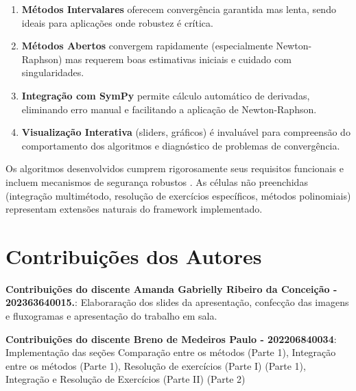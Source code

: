 \documentclass[
	12pt,				%
	openright,			%
	oneside,			%
	a4paper,			%
	english,			%
	brazil				%
	]{abntex2}
\begin{document}
\begin{enumerate}
    \item \textbf{Métodos Intervalares} oferecem convergência garantida mas lenta, sendo ideais para aplicações onde robustez é crítica.
    
    \item \textbf{Métodos Abertos} convergem rapidamente (especialmente Newton-Raphson) mas requerem boas estimativas iniciais e cuidado com singularidades.
    
    \item \textbf{Integração com SymPy} permite cálculo automático de derivadas, eliminando erro manual e facilitando a aplicação de Newton-Raphson.
    
    \item \textbf{Visualização Interativa} (sliders, gráficos) é invaluável para compreensão do comportamento dos algoritmos e diagnóstico de problemas de convergência.
\end{enumerate}

Os algoritmos desenvolvidos cumprem rigorosamente seus requisitos funcionais e incluem mecanismos de segurança robustos \cite{press1992}. As células não preenchidas (integração multimétodo, resolução de exercícios específicos, métodos polinomiais) representam extensões naturais do framework implementado.

\chapter*{Contribuições dos Autores}

\textbf{Contribuições do discente Amanda Gabrielly Ribeiro da Conceição - 202363640015.}: Elaboraração dos slides da apresentação, confecção das imagens e fluxogramas e apresentação do trabalho em sala. \\\vspace{0.3cm}

\textbf{Contribuições do discente Breno de Medeiros Paulo -
202206840034}: Implementação das seções Comparação entre os métodos (Parte 1), Integração entre os métodos (Parte 1), Resolução de exercícios (Parte I) (Parte 1), Integração e Resolução de Exercícios (Parte II) (Parte 2) \\\vspace{0.3cm}
\end{document}
